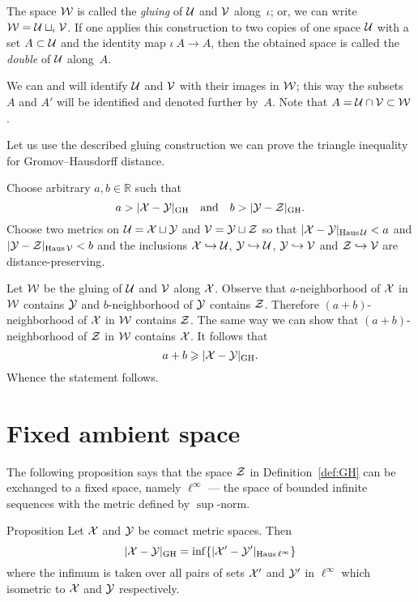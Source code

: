 The  space $\mathcal{W}$ is called the \emph{gluing} of $\mathcal{U}$ and  $\mathcal{V}$ along~$\iota$; or, we can write
$\mathcal{W}=\mathcal{U}\sqcup_\iota\mathcal{V}$.
If one applies this construction to two copies of one space $\mathcal{U}$ with a set $A\subset \mathcal{U}$ and the identity map $\iota\:A\to A$, then the obtained space is called the \emph{double} of $\mathcal{U}$ along~$A$.

We can and will identify $\mathcal{U}$ and $\mathcal{V}$ with their images in $\mathcal{W}$;
this way the subsets $A$ and $A'$ will be identified and denoted further by~$A$.
Note that $A=\mathcal{U}\cap \mathcal{V}\subset \mathcal{W}$.

Let us use the described gluing construction we can prove the triangle inequality for Gromov--Hausdorff distance.

Choose arbitrary $a,b \in \mathbb{R}$ such that
$$a>|\mathcal{X}-\mathcal{Y}|_{\operatorname{\rm GH}\nolimits}
\quad\text{and}\quad
b>|\mathcal{Y}-\mathcal{Z}|_{\operatorname{\rm GH}\nolimits}.$$
Choose two metrics on $\mathcal{U}=\mathcal{X}\sqcup \mathcal{Y}$ and $\mathcal{V}=\mathcal{Y}\sqcup \mathcal{Z}$ so that
$|\spc{X}\z-\spc{Y}|_{\Haus\spc{U}}<a$ and $|\mathcal{Y}-\mathcal{Z}|_{\operatorname{\rm Haus}\nolimits\mathcal{V}}<b$ 
and the inclusions $\mathcal{X}\hookrightarrow \mathcal{U}$, $\mathcal{Y}\hookrightarrow \mathcal{U}$, $\mathcal{Y}\hookrightarrow \mathcal{V}$ and $\mathcal{Z}\hookrightarrow \mathcal{V}$ are distance-preserving.

Let $\mathcal{W}$ be the gluing of $\mathcal{U}$ and $\mathcal{V}$ along $\mathcal{X}$.
Observe that $a$-neighborhood of $\mathcal{X}$ in $\mathcal{W}$ contains $\mathcal{Y}$ and $b$-neighborhood of $\mathcal{Y}$ contains $\mathcal{Z}$.
Therefore $(a+b)$-neighborhood of $\mathcal{X}$ in $\mathcal{W}$ contains $\mathcal{Z}$.
The same way we can show that $(a+b)$-neighborhood of $\mathcal{Z}$ in $\mathcal{W}$ contains $\mathcal{X}$.
It follows that 
$$a+b\geqslant|\mathcal{X}-\mathcal{Y}|_{\operatorname{\rm GH}\nolimits}.$$
Whence the statement follows.
\qeds

\section{Fixed ambient space}

The following proposition says that the space $\mathcal{Z}$ in Definition~\ref{def:GH} can be exchanged to a fixed space, namely $\ell^\infty$ --- the space of bounded infinite sequences with the metric defined by $\sup$-norm.

\begin{thm}{Proposition}\label{prop:GH-with-fixed-Z}
Let $\mathcal{X}$ and $\mathcal{Y}$ be comact metric spaces.
Then
$$|\mathcal{X}-\mathcal{Y}|_{\operatorname{\rm GH}\nolimits} = \inf \{|\mathcal{X}'-\mathcal{Y}'|_{\operatorname{\rm Haus}\nolimits\ell^\infty}\}$$ 
where the infimum is taken over all pairs of sets $\mathcal{X}'$ and $\mathcal{Y}'$ in $\ell^\infty$
which isometric to  $\mathcal{X}$ and $\mathcal{Y}$ respectively.  
\end{thm}




